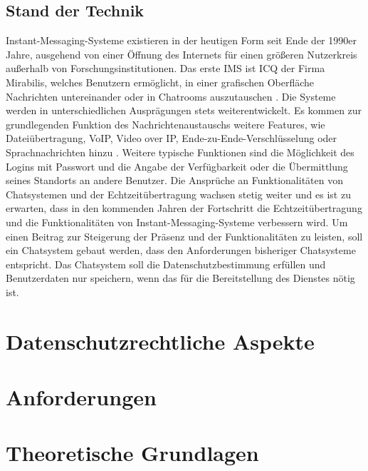\documentclass[a4paper,titlepage,halfparskip,12pt]{scrreprt}
\begin{document}
\begin{onehalfspacing}
\section{Stand der Technik}
\label{sec:StandDerTechnik}

Instant-Messaging-Systeme existieren in der heutigen Form seit Ende der 1990er Jahre, ausgehend von einer Öffnung des Internets für einen größeren Nutzerkreis außerhalb von Forschungsinstitutionen. Das erste \ac{IMS} ist \ac{ICQ} der Firma Mirabilis, welches Benutzern ermöglicht, in einer grafischen Oberfläche Nachrichten untereinander oder in Chatrooms auszutauschen \cite{ICQ}. Die Systeme werden in unterschiedlichen Ausprägungen stets weiterentwickelt. Es kommen zur grundlegenden Funktion des Nachrichtenaustauschs weitere Features, wie Dateiübertragung, \ac{VoIP}, Video over IP, Ende-zu-Ende-Verschlüsselung oder Sprachnachrichten hinzu \cite{gross2007}. 
Weitere typische Funktionen sind die Möglichkeit des Logins mit Passwort und die Angabe der Verfügbarkeit oder die Übermittlung seines Standorts an andere Benutzer. Die Ansprüche an Funktionalitäten von Chatsystemen und der Echtzeitübertragung wachsen stetig weiter und es ist zu erwarten, dass in den kommenden Jahren der Fortschritt die Echtzeitübertragung und die Funktionalitäten von Instant-Messaging-Systeme verbessern wird. Um einen Beitrag zur Steigerung der Präsenz und der Funktionalitäten zu leisten, soll ein Chatsystem gebaut werden, dass den Anforderungen bisheriger Chatsysteme entspricht. Das Chatsystem soll die Datenschutzbestimmung erfüllen und Benutzerdaten nur speichern, wenn das für die Bereitstellung des Dienstes nötig ist.\cite{anastasiaIMS}

\newpage

\chapter{Datenschutzrechtliche Aspekte}
\label{chap:Datenschutz}

\newpage

\chapter{Anforderungen}
\label{Anforderungen}

\newpage

\chapter{Theoretische Grundlagen}
\label{chap:Theorie}


\end{onehalfspacing}
\end{document}
